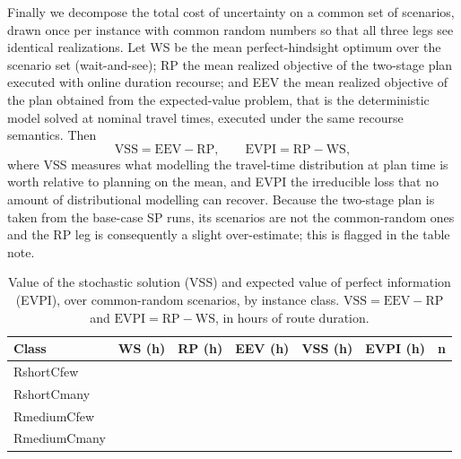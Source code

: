 Finally we decompose the total cost of uncertainty on a common set of scenarios,
drawn once per instance with common random numbers so that all three legs see
identical realizations.  Let WS be the mean perfect-hindsight optimum over the
scenario set (wait-and-see); RP the mean realized objective of the two-stage
plan executed with online duration recourse; and EEV the mean realized objective
of the plan obtained from the expected-value problem, that is the deterministic
model solved at nominal travel times, executed under the same recourse
semantics.  Then
\begin{equation}
\mathrm{VSS} = \mathrm{EEV} - \mathrm{RP}, \qquad
\mathrm{EVPI} = \mathrm{RP} - \mathrm{WS},
\end{equation}
where VSS measures what modelling the travel-time distribution at plan time is
worth relative to planning on the mean, and EVPI the irreducible loss that no
amount of distributional modelling can recover.  Because the two-stage plan is
taken from the base-case SP runs, its scenarios are not the common-random ones
and the RP leg is consequently a slight over-estimate; this is flagged in the
table note.

\begin{table}[htbp]
\centering
\caption{Value of the stochastic solution (VSS) and expected value of perfect
information (EVPI), over common-random scenarios, by instance class.
$\mathrm{VSS} = \mathrm{EEV} - \mathrm{RP}$ and
$\mathrm{EVPI} = \mathrm{RP} - \mathrm{WS}$, in hours of route duration.}
\label{tab:vss}
\begin{tabular}{lrrrrrr}
\toprule
\textbf{Class} & \textbf{WS (h)} & \textbf{RP (h)} & \textbf{EEV (h)} & \textbf{VSS (h)} & \textbf{EVPI (h)} & \textbf{n} \\
\midrule
RshortCfew   & \red{--} & \red{--} & \red{--} & \red{--} & \red{--} & \red{--} \\
RshortCmany  & \red{--} & \red{--} & \red{--} & \red{--} & \red{--} & \red{--} \\
RmediumCfew  & \red{--} & \red{--} & \red{--} & \red{--} & \red{--} & \red{--} \\
RmediumCmany & \red{--} & \red{--} & \red{--} & \red{--} & \red{--} & \red{--} \\
\bottomrule
\end{tabular}
\end{table}

